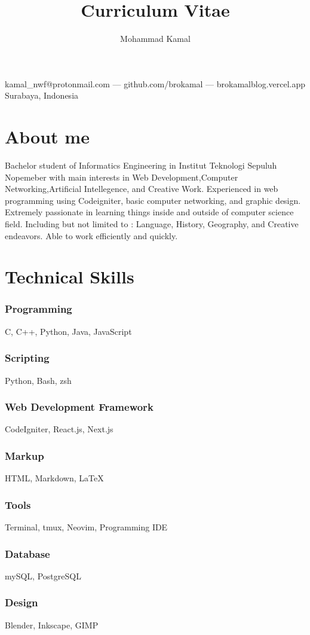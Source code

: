 \documentclass{article}
\makeatletter
\renewcommand{\maketitle}{
\begin{center}
{\huge\bfseries
\theauthor}




\vspace{.25em}

kamal\_nwf@protonmail.com --- github.com/brokamal --- brokamalblog.vercel.app\\
Surabaya, Indonesia 

\end{center}

}
\makeatother
\begin{document}
\title{Curriculum Vitae}
\author{Mohammad Kamal}

\maketitle

\section{About me}
Bachelor student of Informatics Engineering in Institut Teknologi Sepuluh Nopemeber with main interests in Web Development,Computer Networking,Artificial Intellegence, and Creative Work. Experienced in web programming using Codeigniter, basic computer networking, and graphic design. 
\\[1em]
Extremely passionate in learning things inside and outside of computer science field. Including but not limited to : Language, History, Geography, and Creative endeavors. Able to work efficiently and quickly.
\section{Technical Skills}



\subsubsection{Programming}
C, C++, Python, Java, JavaScript
\subsubsection{Scripting}
Python, Bash, zsh
\subsubsection{Web Development Framework}
CodeIgniter, React.js, Next.js
\subsubsection{Markup}
HTML, Markdown, LaTeX
\subsubsection{Tools}
Terminal, tmux, Neovim, Programming IDE
\subsubsection{Database}
mySQL, PostgreSQL
\subsubsection{Design}
Blender, Inkscape, GIMP
\end{document}
